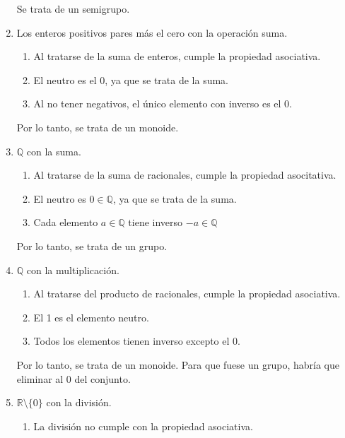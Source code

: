 \begin{enumerate}
    Se trata de un semigrupo.

    \item Los enteros positivos pares más el cero con la operación suma.

    \begin{enumerate}
        \item Al tratarse de la suma de enteros, cumple la propiedad asociativa.
        \item El neutro es el 0, ya que se trata de la suma.
        \item Al no tener negativos, el único elemento con inverso es el 0.
    \end{enumerate}

    Por lo tanto, se trata de un monoide.

    \item $\mathbb{Q}$ con la suma.

    \begin{enumerate}
        \item Al tratarse de la suma de racionales, cumple la propiedad asocitativa.
        \item El neutro es $0 \in \mathbb{Q}$, ya que se trata de la suma.
        \item Cada elemento $a \in \mathbb{Q}$ tiene inverso $-a \in \mathbb{Q}$
    \end{enumerate}

    Por lo tanto, se trata de un grupo.

    \item $\mathbb{Q}$ con la multiplicación.

    \begin{enumerate}
        \item Al tratarse del producto de racionales, cumple la propiedad asociativa.
        \item El 1 es el elemento neutro.
        \item Todos los elementos tienen inverso excepto el 0.
    \end{enumerate}

    Por lo tanto, se trata de un monoide. Para que fuese un grupo, habría que eliminar al 0 del conjunto.

    \item $\mathbb{R}\setminus \{0\}$ con la división.

    \begin{enumerate}
        \item La división no cumple con la propiedad asociativa.
    \end{enumerate}


\end{enumerate}
